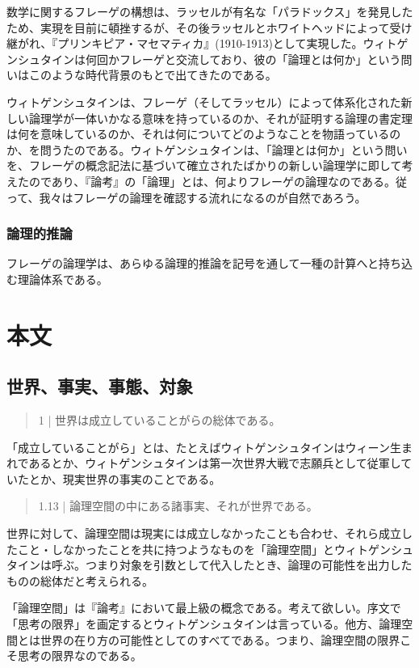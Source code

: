 \documentclass[a4paper,11pt]{jsarticle}
\begin{document}
数学に関するフレーゲの構想は、ラッセルが有名な「パラドックス」を発見したため、実現を目前に頓挫するが、その後ラッセルとホワイトヘッドによって受け継がれ、『プリンキピア・マセマティカ』(1910-1913)として実現した。ウィトゲンシュタインは何回かフレーゲと交流しており、彼の「論理とは何か」という問いはこのような時代背景のもとで出てきたのである。

ウィトゲンシュタインは、フレーゲ（そしてラッセル）によって体系化された新しい論理学が一体いかなる意味を持っているのか、それが証明する論理の書定理は何を意味しているのか、それは何についてどのようなことを物語っているのか、を問うたのである。ウィトゲンシュタインは、「論理とは何か」という問いを、フレーゲの概念記法に基づいて確立されたばかりの新しい論理学に即して考えたのであり、『論考』の「論理」とは、何よりフレーゲの論理なのである。従って、我々はフレーゲの論理を確認する流れになるのが自然であろう。

\subsubsection{論理的推論}
フレーゲの論理学は、あらゆる論理的推論を記号を通して一種の計算へと持ち込む理論体系である。

\section{本文}

\subsection{世界、事実、事態、対象}

\begin{quote}
1 | 世界は成立していることがらの総体である。
\end{quote}
「成立していることがら」とは、たとえばウィトゲンシュタインはウィーン生まれであるとか、ウィトゲンシュタインは第一次世界大戦で志願兵として従軍していたとか、現実世界の事実のことである。

\begin{quote}
1.13 | 論理空間の中にある諸事実、それが世界である。
\end{quote}

世界に対して、論理空間は現実には成立しなかったことも合わせ、それら成立したこと・しなかったことを共に持つようなものを「論理空間」とウィトゲンシュタインは呼ぶ。つまり対象を引数として代入したとき、論理の可能性を出力したものの総体だと考えられる。

「論理空間」は『論考』において最上級の概念である。考えて欲しい。序文で「思考の限界」を画定するとウィトゲンシュタインは言っている。他方、論理空間とは世界の在り方の可能性としてのすべてである。つまり、論理空間の限界こそ思考の限界なのである。
\end{document}
